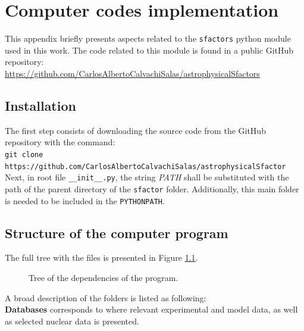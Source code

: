 \documentclass[openany]{book}
\begin{document}
\chapter{Computer codes implementation} \label{ap:codes}

This appendix briefly presents aspects related to the \texttt{sfactors} python module used in this work. The code related to this module is found in a public GitHub repository:  \\

\href{https://github.com/CarlosAlbertoCalvachiSalas/astrophysicalSfactors}{https://github.com/CarlosAlbertoCalvachiSalas/astrophysicalSfactors}

\section{Installation} \label{suc:codesInstallation}

The first step consists of downloading the source code from the GitHub repository with the command: \\

\texttt{git clone https://github.com/CarlosAlbertoCalvachiSalas/astrophysicalSfactor} \\

Next, in root file \texttt{\_\_init\_\_.py}, the string \textit{PATH} shall be substituted with the path of the parent directory of the \texttt{sfactor} folder. Additionally, this main folder is needed to be included in the \texttt{PYTHONPATH}.

\section{Structure of the computer program} \label{sec:programStructure}

The full tree with the files is presented in Figure \ref{fig:programTree}.

\begin{figure}[H]
	
	\caption[Tree of the dependencies of the program]{Tree of the dependencies of the program.}
	\label{fig:programTree}
\end{figure}

A broad description of the folders is listed as following: \\

\textbf{Databases} corresponds to where relevant experimental and model data, as well as selected nuclear data is presented. \\
\end{document}
